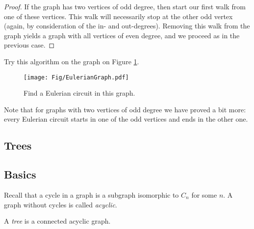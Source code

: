 \begin{page}
\begin{proof}
If the graph has two vertices of odd degree, then start our first walk from one of these vertices.
This walk will necessarily stop at the other odd vertex (again, by consideration of the in- and out-degrees).
Removing this walk from the graph yields a graph with all vertices of even degree, and we proceed as in the previous case.
\end{proof}

Try this algorithm on the graph on Figure \ref{fig:EulerianGraph}.

\begin{figure}[h]
\begin{center}
\texttt{[image: Fig/EulerianGraph.pdf]}
\end{center}
\caption{Find a Eulerian circuit in this graph.}
\label{fig:EulerianGraph}
\end{figure}

Note that for graphs with two vertices of odd degree we have proved a bit more:
every Eulerian circuit starts in one of the odd vertices and ends in the other one.












\end{page}

\begin{page}

\section{Trees}
\subsection{Basics}
Recall that a cycle in a graph is a subgraph isomorphic to $C_n$ for some $n$.
A graph without cycles is called \emph{acyclic}.

\end{page}

\begin{page}

\begin{dfn}
A \emph{tree} is a connected acyclic graph.
\end{dfn}

\end{page}

